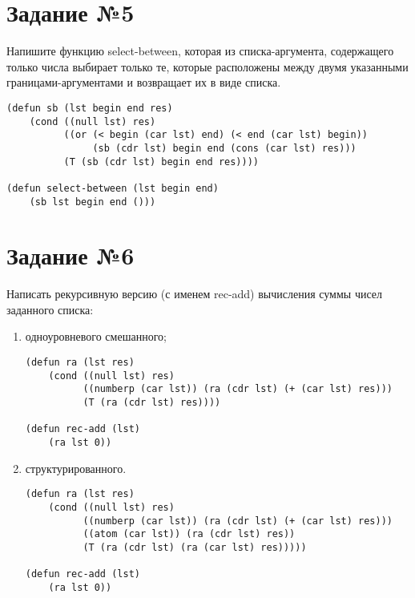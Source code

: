 \section{Задание №5}

Напишите функцию select-between, которая из списка-аргумента, содержащего только
числа выбирает только те, которые расположены между двумя указанными
границами-аргументами и возвращает их в виде списка.

\vspace{4mm}
\begin{minipage}{0.92\linewidth}
\begin{lstlisting}
(defun sb (lst begin end res)
    (cond ((null lst) res)
          ((or (< begin (car lst) end) (< end (car lst) begin))
               (sb (cdr lst) begin end (cons (car lst) res)))
          (T (sb (cdr lst) begin end res))))

(defun select-between (lst begin end)
    (sb lst begin end ()))
\end{lstlisting}
\end{minipage}

\section{Задание №6}

Написать рекурсивную версию (с именем rec-add) вычисления суммы чисел
заданного списка: 
\begin{enumerate}
    \item одноуровневого смешанного;

\vspace{4mm}
\begin{minipage}{0.92\linewidth}
\begin{lstlisting}
(defun ra (lst res)
    (cond ((null lst) res)
          ((numberp (car lst)) (ra (cdr lst) (+ (car lst) res)))
          (T (ra (cdr lst) res))))

(defun rec-add (lst)
    (ra lst 0))
\end{lstlisting}
\end{minipage}

    \item структурированного.

\vspace{4mm}
\begin{minipage}{0.92\linewidth}
\begin{lstlisting}
(defun ra (lst res)
    (cond ((null lst) res)
          ((numberp (car lst)) (ra (cdr lst) (+ (car lst) res)))
          ((atom (car lst)) (ra (cdr lst) res))
          (T (ra (cdr lst) (ra (car lst) res)))))

(defun rec-add (lst)
    (ra lst 0))
\end{lstlisting}
\end{minipage}

\end{enumerate}

